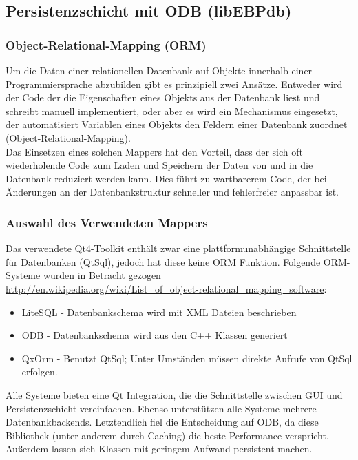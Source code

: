 \newpage

\subsection{Persistenzschicht mit ODB (libEBPdb)}

\subsubsection{Object-Relational-Mapping (ORM)}
Um die Daten einer relationellen Datenbank auf Objekte innerhalb einer Programmiersprache abzubilden gibt es prinzipiell zwei Ansätze.
Entweder wird der Code der die Eigenschaften eines Objekts aus der Datenbank liest und schreibt manuell implementiert, oder aber es wird ein Mechanismus eingesetzt, der automatisiert Variablen eines Objekts den Feldern einer Datenbank zuordnet (Object-Relational-Mapping).\\
Das Einsetzen eines solchen Mappers hat den Vorteil, dass der sich oft wiederholende Code zum Laden und Speichern der Daten von und in die Datenbank reduziert werden kann. Dies führt zu wartbarerem Code, der bei Änderungen an der Datenbankstruktur schneller und fehlerfreier anpassbar ist.

\subsubsection{Auswahl des Verwendeten Mappers}
Das verwendete Qt4-Toolkit enthält zwar eine plattformunabhängige Schnittstelle für Datenbanken (QtSql), jedoch hat diese keine ORM Funktion.
Folgende ORM-Systeme wurden in Betracht gezogen\\
\url{http://en.wikipedia.org/wiki/List_of_object-relational_mapping_software}:
\begin{itemize}
	\item LiteSQL - Datenbankschema wird mit XML Dateien beschrieben
	\item ODB - Datenbankschema wird aus den C++ Klassen generiert
	\item QxOrm - Benutzt QtSql; Unter Umständen müssen direkte Aufrufe von QtSql erfolgen. \cite{QxOrm_Tutorial}
\end{itemize}
Alle Systeme bieten eine Qt Integration, die die Schnittstelle zwischen GUI und Persistenzschicht vereinfachen.
Ebenso unterstützen alle Systeme mehrere Datenbankbackends.
Letztendlich fiel die Entscheidung auf ODB, da diese Bibliothek (unter anderem durch Caching) die beste Performance verspricht.
Außerdem lassen sich Klassen mit geringem Aufwand persistent machen.

